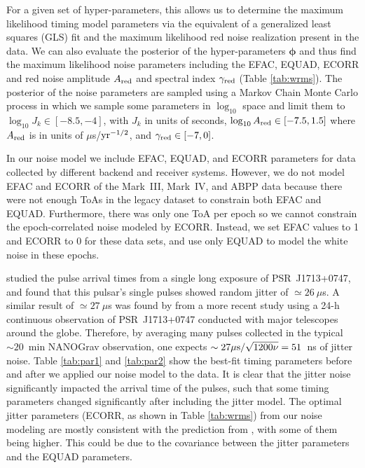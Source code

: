 


For a given set of hyper-parameters, this allows us to determine the maximum
likelihood timing model parameters via the equivalent of a generalized least
squares (GLS) fit and the maximum likelihood red noise realization present in the data. 
We can also evaluate the posterior of the hyper-parameters $\boldsymbol{\phi}$
and thus find the maximum likelihood noise parameters including the EFAC, EQUAD,
ECORR and red noise amplitude $A_{\rm red}$ and spectral index $\gamma_{\rm
red}$ (Table \ref{tab:wrms}).
The posterior of the noise parameters are sampled using a Markov Chain Monte
Carlo process in which we sample some parameters in $\log_{10}$ space and
limit them to $\log_{10}J_{k}\in[-8.5, -4]$, with $J_{k}$ in units of seconds,
$\log_{10}A_{\rm red}\in[-7.5,1.5]$ where $A_{\rm red}$ is in units of
$\mu$s/${\rm yr}^{-1/2}$, and $\gamma_{\rm red}\in[-7,0]$. 


In our noise model we include EFAC, EQUAD, and ECORR parameters
for data collected by different backend and receiver systems. However, we do not model 
EFAC and ECORR of the Mark~III, Mark~IV, and ABPP data because there were not
enough ToAs in the legacy dataset to constrain both EFAC and EQUAD. Furthermore,
there was only one ToA per epoch so we cannot constrain the epoch-correlated
noise modeled by ECORR. Instead, we set EFAC values to 1
and ECORR to 0 for these data sets, and use only EQUAD to model the white noise in these epochs.



\citet{sc12} studied the pulse arrival times from a single long exposure of
PSR~J1713+0747, and found that this pulsar's single pulses showed random jitter of
$\simeq26~\mu$s. 
A similar result of $\simeq27~\mu$s was found by \citet{dlc+14} from a more recent study using a 24-h continuous observation of PSR~J1713+0747 conducted with major telescopes around the globe.
Therefore, by averaging many pulses collected in the typical
$\sim20$~min NANOGrav observation, one expects $\sim27\mu{\rm s}/\sqrt{1200\nu}=51$~ns of jitter noise. 
Table \ref{tab:par1} and \ref{tab:par2} show the best-fit timing parameters before and
after we applied our noise model to the data. It is clear that the jitter
noise significantly impacted the arrival time of the pulses, such that 
some timing parameters changed significantly after including the jitter model.
The optimal jitter parameters (ECORR, as shown in Table \ref{tab:wrms}) from
our noise modeling are mostly consistent with the prediction from
\citet{sc12}, with some of them being higher. This could be due to the
covariance between the jitter parameters and the EQUAD parameters.

